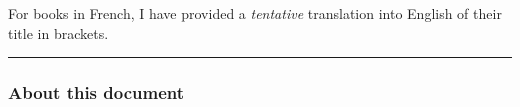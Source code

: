 \documentclass[11pt,a4paper,svgnames]{article}
\begin{document}

\clearpage


\medskip


\printindex

\medskip

\clearpage
{}


\medskip



\begin{flushright}
  \begin{relsize}{-2}
    For books in French, I have provided a \emph{tentative} translation into
    English of their title in brackets.
  \end{relsize}
\end{flushright}

\medskip

\bigskip

\hrule

\bigskip

\subsubsection*{About this document}
\end{document}

